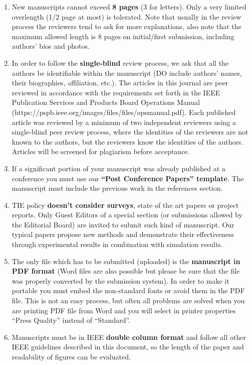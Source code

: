 \documentclass[journal]{IEEEtranTICPS}
\begin{document}
\begin{enumerate}[1)]
	\item New manuscripts cannot exceed \textbf{8 pages} (3 for letters). Only a very limited overlength (1/2 page at most) is tolerated. Note that usually in the review process the reviewers tend to ask for more explanations, also note that the maximum allowed length is 8 pages on initial/first submission, including authors' bios and photos.
	\item In order to follow the \textbf{single-blind} review process, we ask that all the authors be identifiable within the manuscript (DO include authors' names, their biographies, affiliation, etc.). The articles in this journal are peer reviewed in accordance with the requirements set forth in the IEEE Publication Services and Products Board Operations Manual (https://pspb.ieee.org/images/files/files/opsmanual.pdf). Each published article was reviewed by a minimum of two independent reviewers using a single-blind peer review process, where the identities of the reviewers are not known to the authors, but the reviewers know the identities of the authors. Articles will be screened for plagiarism before acceptance.
	\item If a significant portion of your manuscript was already published at a conference you must use our \textbf{``Post Conference Papers'' template}. The manuscript must include the previous work in the references section. 
	\item TIE policy \textbf{doesn't consider surveys}, state of the art papers or project reports. Only Guest Editors of a special section (or submissions allowed by the Editorial Board) are invited to submit such kind of manuscript. Our typical papers propose new methods and demonstrate their effectiveness through experimental results in combination with simulation results.
	\item The only file which has to be submitted (uploaded) is the \textbf{manuscript in PDF format} (Word files are also possible but please be sure that the file was properly converted by the submission system). In order to make it portable you must embed the non-standard fonts or avoid them in the PDF file. This is not an easy process, but often all problems are solved when you are printing PDF file from Word and you will select in printer properties  ``Press Quality'' instead of ``Standard''.
	\item Manuscripts must be in IEEE \textbf{double column format} and follow all other IEEE guidelines described in this document, so the length of the paper and readability of figures can be evaluated.

\end{enumerate}
\end{document}
